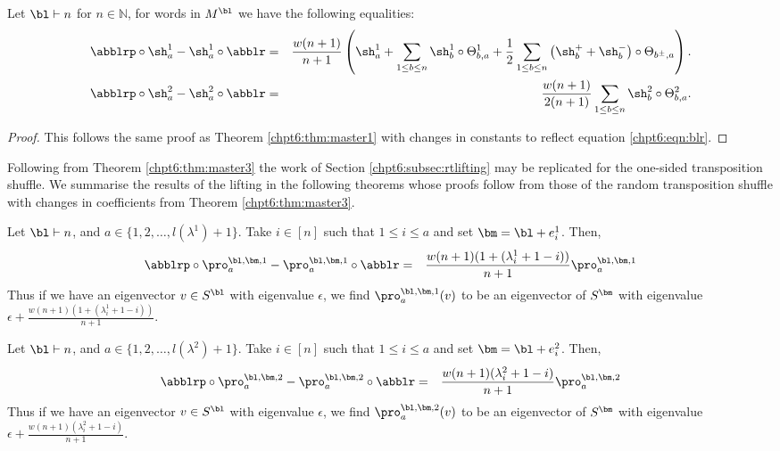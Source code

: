 \documentclass[11pt]{report}
\begin{document}
\begin{thm}
	\label{chpt6:thm:master3}
	Let $\bl \vdash n$ for $n\in \mathbb{N}$, for words in $M^{\bl}$ we have the following equalities: 
	\begin{eqnarray}
	\abblrp \circ \sh_{a}^{1} - \sh_{a}^{1} \circ 
	\abblr & = & \frac{w(n+1)}{n+1} \left(\sh_{a}^{1} +  
	\sum_{1 \leq b \leq n} 
	\sh_{b}^{1}\circ\Theta_{b,a}^{1} + \frac{1}{2}\sum_{1\leq b\leq n} 
	\left(\sh_{b}^{+} + \sh_{b}^{-}\right)  
	\circ\Theta_{b^{\pm},a} \right). \nonumber
	\\
	\abblrp \circ \sh_{a}^{2} - \sh_{a}^{2} \circ 
	\abblr & = &\frac{w(n+1)}{2(n+1)} \sum_{1 \leq b \leq n} 
	\sh_{b}^{2}\circ \Theta_{b,a}^{2}. \nonumber
	\end{eqnarray}
	
\end{thm}

\begin{proof}
	This follows the same proof as Theorem \ref{chpt6:thm:master1} with changes in constants to reflect equation \eqref{chpt6:eqn:blr}.
\end{proof}

Following from Theorem \ref{chpt6:thm:master3} the work of Section \ref{chpt6:subsec:rtlifting} may be replicated for the one-sided transposition shuffle. We summarise the results of the lifting in the following theorems whose proofs follow from those of the random transposition shuffle with changes in coefficients from Theorem \ref{chpt6:thm:master3}.



\begin{thm}
	\label{chpt6:thm:lifting3}
	Let $\bl \vdash n$, and  $a \in \{1,2,\ldots,l(\lambda^{1})+1\}$. Take $i\in [n]$ such that  $1 \leq i \leq a$ and set $\bm = \bl +e_{i}^{1}$. Then,
	\begin{eqnarray*}
		\abblrp \circ \pro^{\bl,\bm,1}_{a} - 
		\pro^{\bl,\bm,1}_{a} \circ \abblr & = & \frac{w(n+1)(1 + (\lambda^{1}_{i}+1-i))}{n+1}\pro^{\bl,\bm,1}_{a}
	\end{eqnarray*}
	Thus if we have an eigenvector $v \in S^{\bl}$ with 
	eigenvalue $\epsilon$, we find 
	$\pro^{\bl,\bm,1}_{a}(v)$ to be an eigenvector of
	$S^{\bm}$ with eigenvalue $\epsilon + \frac{w(n+1)(1 + (\lambda^{1}_{i}+1-i))}{n+1}$.
\end{thm}


\begin{thm}
	\label{chpt6:thm:lifting4}
	Let $\bl \vdash n$, and  $a \in \{1,2,\ldots,l(\lambda^{2})+1\}$. Take $i\in [n]$ such that  $1 \leq i \leq a$ and set $\bm = \bl +e_{i}^{2}$. Then,
	\begin{eqnarray*}
		\abblrp \circ \pro^{\bl,\bm,2}_{a}  - 
		\pro^{\bl,\bm,2}_{a}  \circ \abblr & = & 
		\frac{w(n+1)(\lambda^{2}_{i}+1-i)}{n+1} \pro^{\bl,\bm,2}_{a} 
	\end{eqnarray*}
	Thus if we have an eigenvector $v \in S^{\bl}$ with 
	eigenvalue $\epsilon$, we find 
	$\pro^{\bl,\bm,2}_{a} (v)$ to be an eigenvector of
	$S^{\bm}$ with eigenvalue $\epsilon +\frac{w(n+1)(\lambda^{2}_{i}+1-i)}{n+1}$.
\end{thm}
\end{document}
